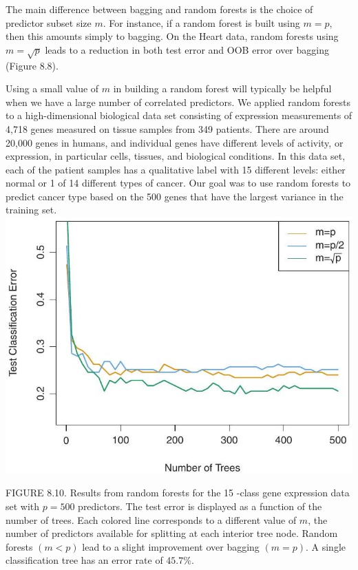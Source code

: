 \documentclass[10pt]{article}
\begin{document}
The main difference between bagging and random forests is the choice of predictor subset size $m$. For instance, if a random forest is built using $m=p$, then this amounts simply to bagging. On the Heart data, random forests using $m=\sqrt{p}$ leads to a reduction in both test error and OOB error over bagging (Figure 8.8).

Using a small value of $m$ in building a random forest will typically be helpful when we have a large number of correlated predictors. We applied random forests to a high-dimensional biological data set consisting of expression measurements of 4,718 genes measured on tissue samples from 349 patients. There are around 20,000 genes in humans, and individual genes have different levels of activity, or expression, in particular cells, tissues, and biological conditions. In this data set, each of the patient samples has a qualitative label with 15 different levels: either normal or 1 of 14 different types of cancer. Our goal was to use random forests to predict cancer type based on the 500 genes that have the largest variance in the training set.\\
\includegraphics[max width=\textwidth, center]{2025_05_05_efe77898333945044de4g-336}

FIGURE 8.10. Results from random forests for the 15 -class gene expression data set with $p=500$ predictors. The test error is displayed as a function of the number of trees. Each colored line corresponds to a different value of $m$, the number of predictors available for splitting at each interior tree node. Random forests $(m<p)$ lead to a slight improvement over bagging $(m=p)$. A single classification tree has an error rate of $45.7 \%$.
\end{document}
